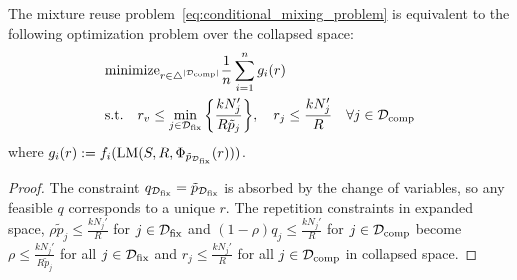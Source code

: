 \begin{lemma}\label{lem:collapsed_space}
The mixture reuse problem~\eqref{eq:conditional_mixing_problem} is equivalent to the following optimization problem over the collapsed space:
\begin{align}
    &\text{minimize}_{r \in \triangle^{|\mathcal{D}_{\text{comp}}|}}  \frac{1}{n} \sum_{i = 1}^n g_i(r) \\
    &\text{s.t.} \quad r_v \le \min_{j \in \mathcal{D}_{\text{fix}}}\bigg\{\frac{k N_j'}{R \tilde{p}_{j}} \bigg\}, \quad r_j \le \frac{k N_j'}{R} \quad \forall j \in \mathcal{D}_{\text{comp}} \nonumber
\end{align}
where $g_i(r) := f_i(\text{LM}(S, R, \Phi_{\tilde{p}_{\mathcal{D}_{\text{fix}}}}(r)))$.
\end{lemma}
\begin{proof}
The constraint $q_{\mathcal{D}_{\text{fix}}} = \tilde{p}_{\mathcal{D}_{\text{fix}}}$ is absorbed by the change of variables, so any feasible $q$ corresponds to a unique $r$. The repetition constraints in expanded space, $\rho \tilde{p}_{j} \le \frac{k N_j'}{R}$ for $j \in \mathcal{D}_{\text{fix}}$ and $(1 - \rho) q_j \le \frac{k N_j'}{R}$ for $j \in \mathcal{D}_{\text{comp}}$ become $\rho \le \frac{k N_j'}{R \tilde{p}_j}$ for all $j \in \mathcal{D}_{\text{fix}}$ and $r_j \le \frac{kN_j'}{R}$ for all $j \in \mathcal{D}_{\text{comp}}$ in collapsed space.
\end{proof}

